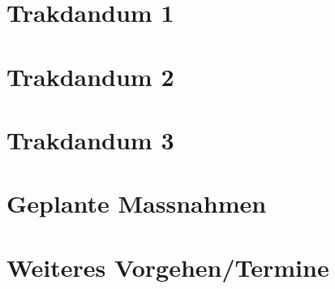 \section{Trakdandum 1}


\section{Trakdandum 2}


\section{Trakdandum 3}


\section{Geplante Massnahmen}


\section{Weiteres Vorgehen/Termine}



